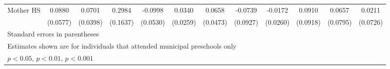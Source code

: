 \begin{table}[htbp]
\begin{tabular}{l*{11}{c}}
\addlinespace
Mother HS   &      0.0880         &      0.0701         &      0.2984         &     -0.0998         &      0.0340         &      0.0658         &     -0.0739         &     -0.0172         &      0.0910         &      0.0657         &      0.0211         \\
            &    (0.0577)         &    (0.0398)         &    (0.1637)         &    (0.0530)         &    (0.0259)         &    (0.0473)         &    (0.0927)         &    (0.0260)         &    (0.0918)         &    (0.0795)         &    (0.0726)         \\
\bottomrule
\multicolumn{12}{l}{\footnotesize Standard errors in parentheses}\\
\multicolumn{12}{l}{\footnotesize Estimates shown are for individuals that attended municipal preschools only}\\
\multicolumn{12}{l}{\footnotesize \sym{*} \(p<0.05\), \sym{**} \(p<0.01\), \sym{***} \(p<0.001\)}\\
\end{tabular}
\end{table}
